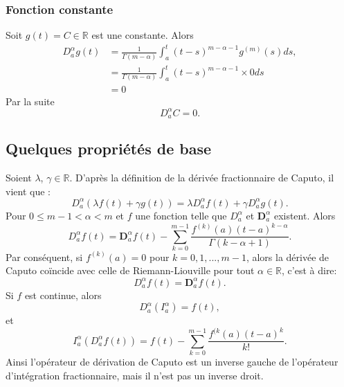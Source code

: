 \subsubsection*{Fonction constante} 
Soit $g(t) =C \in \mathbb{R}$ est une constante. Alors 
\begin{align*}
    D_a^{\alpha} g(t) &= \frac{1}{\Gamma(m-\alpha)} \int_a^t (t-s)^{m-\alpha-1} g^{(m)}(s) ds,\\
    &= \frac{1}{\Gamma(m-\alpha)}\int_a^t(t-s)^{m-\alpha-1} \times 0ds \\
    &=0
\end{align*}
Par la suite
\begin{equation*}
    D_a^{\alpha} C = 0.
\end{equation*}
\subsection{Quelques propriétés de base}
Soient $\lambda$, $\gamma \in \mathbb{R}$. D'après la définition de la dérivée fractionnaire de Caputo, il vient que :
\begin{equation}
    D_a^{\alpha}(\lambda f(t)+\gamma g(t))=\lambda D_a^{\alpha}f(t) + \gamma D_a^{\alpha}g(t).
\end{equation}
Pour $0\leq m-1<\alpha<m$ et $f$ une fonction telle que $D_a^{\alpha}$ et $\textbf{D}_a^{\alpha}$ existent. Alors 
\begin{equation}
    D_a^{\alpha} f(t) = \textbf{D}_a^{\alpha}f(t) -\sum_{k=0}^{m-1} \frac{f^{(k)}(a)(t-a)^{k-\alpha}}{\Gamma(k-\alpha+1)}.
\end{equation}
Par conséquent, si $f^{(k)}(a)=0$ pour $k=0,1,...,m-1$, alors la dérivée de Caputo coïncide avec celle de Riemann-Liouville pour tout $\alpha\in\mathbb{R}$, c'est à dire:
\begin{equation*}
    D_a^{\alpha} f(t) = \textbf{D}_a^{\alpha} f(t).
\end{equation*}
Si $f$ est continue, alors
\begin{equation*}
    D_a^{\alpha}(I_a^{\alpha})=f(t),
\end{equation*}
et \begin{equation*}
    I_a^{\alpha}\left(D_a^{\alpha} f(t) \right)=f(t)-\sum_{k=0}^{m-1} \frac{f^{(k}(a)(t-a)^k}{k!}.
\end{equation*}
Ainsi l'opérateur de dérivation de Caputo est un inverse gauche de l'opérateur d'intégration fractionnaire, mais il n'est pas un inverse droit.

